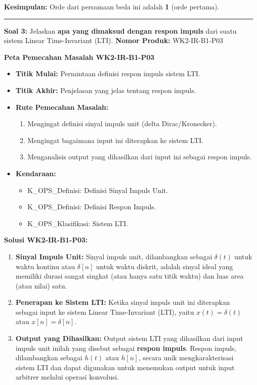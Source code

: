 \documentclass[
  letterpaper,
  DIV=11,
  numbers=noendperiod]{scrreprt}
\providecommand{\tightlist}{%
  \setlength{\itemsep}{0pt}\setlength{\parskip}{0pt}}
\begin{document}
\textbf{Kesimpulan:} Orde dari persamaan beda ini adalah \textbf{1}
(orde pertama).

\begin{center}\rule{0.5\linewidth}{0.5pt}\end{center}

\textbf{Soal 3:} Jelaskan \textbf{apa yang dimaksud dengan respon
impuls} dari suatu sistem Linear Time-Invariant (LTI). \textbf{Nomor
Produk:} WK2-IR-B1-P03

\textbf{Peta Pemecahan Masalah WK2-IR-B1-P03}

\begin{itemize}
\tightlist
\item
  \textbf{Titik Mulai:} Permintaan definisi respon impuls sistem LTI.
\item
  \textbf{Titik Akhir:} Penjelasan yang jelas tentang respon impuls.
\item
  \textbf{Rute Pemecahan Masalah:}

  \begin{enumerate}
  \def\labelenumi{\arabic{enumi}.}
  \tightlist
  \item
    Mengingat definisi sinyal impuls unit (delta Dirac/Kronecker).
  \item
    Mengingat bagaimana input ini diterapkan ke sistem LTI.
  \item
    Menganalisis output yang dihasilkan dari input ini sebagai respon
    impuls.
  \end{enumerate}
\item
  \textbf{Kendaraan:}

  \begin{itemize}
  \tightlist
  \item
    K\_OPS\_Definisi: Definisi Sinyal Impuls Unit.
  \item
    K\_OPS\_Definisi: Definisi Respon Impuls.
  \item
    K\_OPS\_Klasifikasi: Sistem LTI.
  \end{itemize}
\end{itemize}

\textbf{Solusi WK2-IR-B1-P03:}

\begin{enumerate}
\def\labelenumi{\arabic{enumi}.}
\tightlist
\item
  \textbf{Sinyal Impuls Unit:} Sinyal impuls unit, dilambangkan sebagai
  \(\delta(t)\) untuk waktu kontinu atau \(\delta[n]\) untuk waktu
  diskrit, adalah sinyal ideal yang memiliki durasi sangat singkat (atau
  hanya satu titik waktu) dan luas area (atau nilai) satu.
\item
  \textbf{Penerapan ke Sistem LTI:} Ketika sinyal impuls unit ini
  diterapkan sebagai input ke sistem Linear Time-Invariant (LTI), yaitu
  \(x(t) = \delta(t)\) atau \(x[n] = \delta[n]\).
\item
  \textbf{Output yang Dihasilkan:} Output sistem LTI yang dihasilkan
  dari input impuls unit inilah yang disebut sebagai \textbf{respon
  impuls}. Respon impuls, dilambangkan sebagai \(h(t)\) atau \(h[n]\),
  secara unik mengkarakterisasi sistem LTI dan dapat digunakan untuk
  menemukan output untuk input arbitrer melalui operasi konvolusi.
\end{enumerate}
\end{document}
